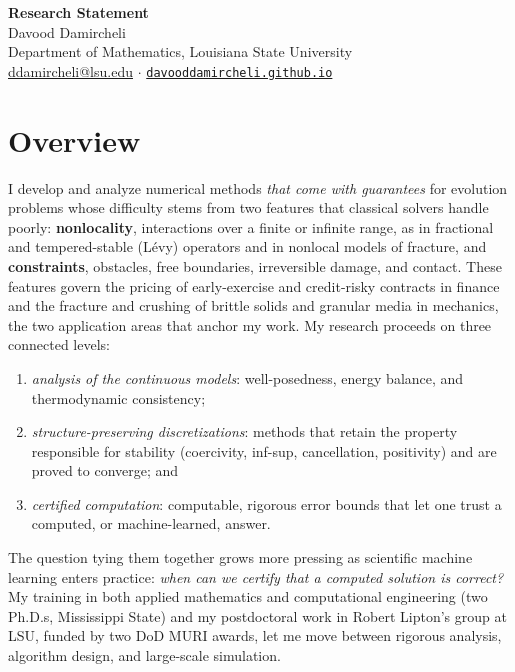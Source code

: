 \documentclass[11pt]{article}
\begin{document}
\begin{center}
{\LARGE\bfseries Research Statement}\\[3pt]
{\large Davood Damircheli}\\[1pt]
{\small Department of Mathematics, Louisiana State University\\
\href{mailto:ddamircheli@lsu.edu}{ddamircheli@lsu.edu} \;$\cdot$\;
\href{https://davooddamircheli.github.io}{\nolinkurl{davooddamircheli.github.io}}}
\end{center}
\vspace{-4pt}

\section*{Overview}

I develop and analyze numerical methods \emph{that come with guarantees} for
evolution problems whose difficulty stems from two features that classical
solvers handle poorly: \textbf{nonlocality}, interactions over a finite or
infinite range, as in fractional and tempered-stable (L\'evy) operators and in
nonlocal models of fracture, and \textbf{constraints}, obstacles, free
boundaries, irreversible damage, and contact. These features govern the pricing
of early-exercise and credit-risky contracts in finance and the fracture and
crushing of brittle solids and granular media in mechanics, the two application
areas that anchor my work. My research proceeds on three connected levels:
\begin{enumerate}[label=(\roman*),leftmargin=2.2em]
\item \emph{analysis of the continuous models}: well-posedness, energy balance,
      and thermodynamic consistency;
\item \emph{structure-preserving discretizations}: methods that retain the
      property responsible for stability (coercivity, inf-sup, cancellation,
      positivity) and are proved to converge; and
\item \emph{certified computation}: computable, rigorous error bounds that let
      one trust a computed, or machine-learned, answer.
\end{enumerate}
The question tying them together grows more pressing as scientific machine
learning enters practice: \emph{when can we certify that a computed solution is correct?} My training in both applied mathematics and
computational engineering (two Ph.D.s, Mississippi State) and my postdoctoral
work in Robert Lipton's group at LSU, funded by two DoD MURI awards, let me move
between rigorous analysis, algorithm design, and large-scale simulation.
\end{document}
